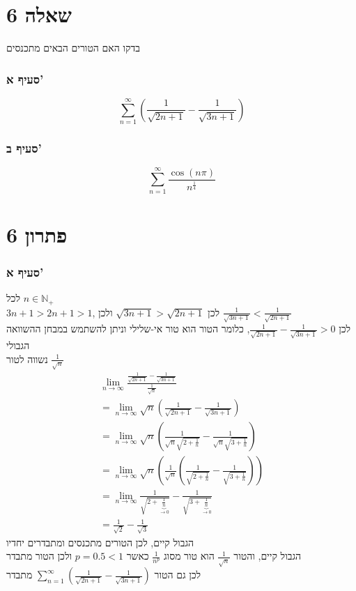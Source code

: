 \documentclass[12pt, titlepage]{article}
\begin{document}
\part*{שאלה 6}
בדקו האם הטורים הבאים מתכנסים
\section*{סעיף א'}
\[
	\sum_{n=1}^\infty \left(\frac{1}{\sqrt{2n+1}}-\frac{1}{\sqrt{3n+1}}\right)
\]
\section*{סעיף ב'}
\[
	\sum_{n=1}^\infty \frac{\cos\left( n\pi\right)}{n^\frac{1}{4}}
\]
\part*{פתרון 6}
\section*{סעיף א'}
לכל $n\in \mathbb{N}_+$ \\
$3n + 1 > 2n + 1  > 1$, לכן $\sqrt{3n+1} > \sqrt{2n+1}$ ולכן $\frac{1}{\sqrt{3n+1}} < \frac{1}{\sqrt{2n+1}}$\\
לכן $\frac{1}{\sqrt{2n+1}}-\frac{1}{\sqrt{3n+1}}>0$, כלומר הטור הוא טור אי-שלילי וניתן להשתמש במבחן ההשוואה הגבולי\\
נשווה לטור $\frac{1}{\sqrt{n}}$
\begin{gather*}
    \lim_{n\to\infty} \frac{\frac{1}{\sqrt{2n+1}}-\frac{1}{\sqrt{3n+1}}}{\frac{1}{\sqrt{n}}} \\
    = \lim_{n\to\infty} \sqrt{n}\left( \frac{1}{\sqrt{2n+1}}-\frac{1}{\sqrt{3n+1}}\right) \\
    = \lim_{n\to\infty} \sqrt{n}\left( \frac{1}{\sqrt{n}\sqrt{2+\frac{1}{n}}}-\frac{1}{\sqrt{n}\sqrt{3+\frac{1}{n}}}\right) \\
    = \lim_{n\to\infty} \sqrt{n} \left(\frac{1}{\sqrt{n}}\left(\frac{1}{\sqrt{2+\frac{1}{n}}}-\frac{1}{\sqrt{3+\frac{1}{n}}}\right)\right)\\
    = \lim_{n\to\infty} \frac{1}{\sqrt{2+\underbrace{\frac{1}{n}}_{\to 0}}} - \frac{1}{\sqrt{3+\underbrace{\frac{1}{n}}_{\to 0}}} \\
    = \frac{1}{\sqrt{2}} - \frac{1}{\sqrt{3}}
\end{gather*}
הגבול קיים, לכן הטורים מתכנסים ומתבדרים יחדיו\\
הגבול קיים, והטור $\frac{1}{\sqrt{n}}$ הוא טור מסוג $\frac{1}{n^p}$ כאשר $p=0.5 < 1$ ולכן הטור מתבדר\\
לכן גם הטור $\sum_{n=1}^\infty \left(\frac{1}{\sqrt{2n+1}}-\frac{1}{\sqrt{3n+1}}\right)$ מתבדר
\end{document}
